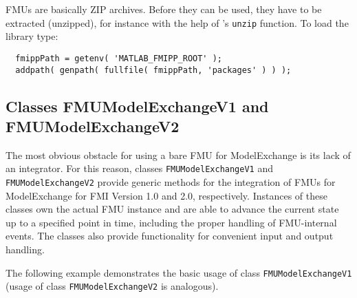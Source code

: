 FMUs are basically ZIP archives.
Before they can be used, they have to be extracted (unzipped), for instance with the help of \matlab's \texttt{unzip} function.
To load the library type:

\begin{verbatim}
  fmippPath = getenv( 'MATLAB_FMIPP_ROOT' );
  addpath( genpath( fullfile( fmippPath, 'packages' ) ) );
\end{verbatim}

\subsection{Classes FMUModelExchangeV1 and FMUModelExchangeV2}

The most obvious obstacle for using a bare FMU for ModelExchange is its lack of an integrator.
For this reason, classes \texttt{FMUModelExchangeV1} and \texttt{FMUModelExchangeV2} provide generic methods for the integration of FMUs for ModelExchange for FMI Version 1.0 and 2.0, respectively.
Instances of these classes own the actual FMU instance and are able to advance the current state up to a specified point in time, including the
proper handling of FMU-internal events.
The classes also provide functionality for convenient input and output handling.

The following example demonstrates the basic usage of class \texttt{FMUModelExchangeV1} (usage of class \texttt{FMUModelExchangeV2} is analogous).

